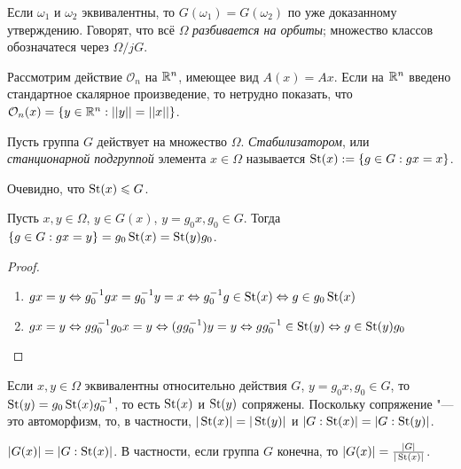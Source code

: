 \begin{note}
	Если $\omega_1$ и $\omega_2$ эквивалентны, то $G(\omega_1) = G(\omega_2)$ по уже доказанному утверждению. Говорят, что всё $\Omega$ \textit{разбивается на орбиты}; множество классов обозначатеся через $\Omega /j G$.
\end{note}

\begin{example}
	Рассмотрим действие $\mathcal{O}_n$ на $\mathbb{R}^n$, имеющее вид $A(x) = Ax$. Если на $\mathbb{R}^n$ введено стандартное скалярное произведение, то нетрудно показать, что $\mathcal{O}_n(x) = \{y \in \R^n: ||y|| \hm= ||x||\}$.
\end{example}

\begin{definition}
	Пусть группа $G$ действует на множество $\Omega$. \textit{Стабилизатором}, или \textit{станционарной подгруппой} элемента $x \in \Omega$ называется $\operatorname{St}(x) := \{g \in G: gx = x\}$.
\end{definition}

\begin{note}
	Очевидно, что $\operatorname{St}(x) \leqslant G$.
\end{note}

\begin{proposition}
	Пусть $x, y \in \Omega$, $y \in G(x)$, $y = g_0x, g_0 \in G$. Тогда $\{g \in G: gx = y\} \hm= g_0\St(x) = \St(y)g_0$.
\end{proposition}

\begin{proof}~
	\begin{enumerate}
		\item $gx = y \Leftrightarrow g^{-1}_0gx = g^{-1}_0y = x \Leftrightarrow g_0^{-1}g \in \St(x) \hm\Leftrightarrow g \in g_0\St(x)$
		\item $gx \hm= y \Leftrightarrow gg_0^{-1}g_0x = y \Leftrightarrow (gg_0^{-1})y = y \Leftrightarrow gg_0^{-1} \in \St(y) \Leftrightarrow g \hm\in \St(y)g_0$
	\end{enumerate}
\end{proof}

\begin{corollary}
	Если $x, y \in \Omega$ эквивалентны относительно действия $G$, $y = g_0x, g_0 \in G$, то $\operatorname{St}(y) = g_0\operatorname{St}(x)g_0^{-1}$, то есть $\operatorname{St}(x)$ и $\operatorname{St}(y)$ сопряжены. Поскольку сопряжение "--- это автоморфизм, то, в частности, $|\operatorname{St}(x)| = |\operatorname{St}(y)|$ и $|G : \operatorname{St}(x)| = |G : \operatorname{St}(y)|$.
\end{corollary}

\begin{corollary}
	$|G(x)| = |G : \operatorname{St}(x)|$. В частности, если группа $G$ конечна, то $|G(x)| = \frac{|G|}{|\operatorname{St}(x)|}$.
\end{corollary}

